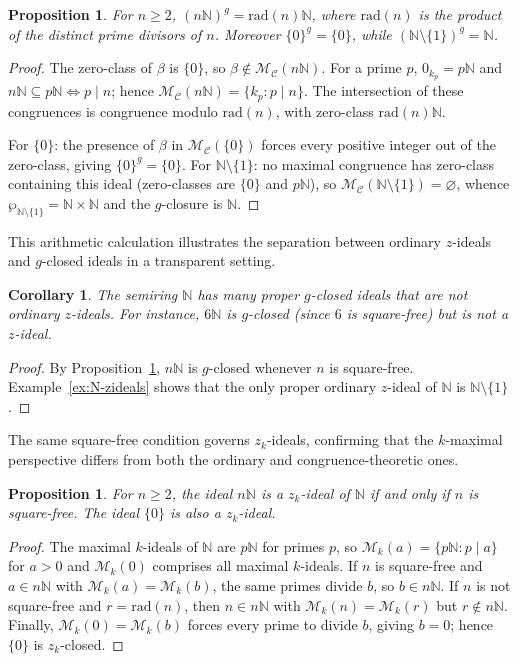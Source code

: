 \documentclass[11pt,leqno]{amsart}
\theoremstyle{plain}
\newtheorem{proposition}[theorem]{Proposition}
\newtheorem{corollary}[theorem]{Corollary}
\theoremstyle{definition}
\theoremstyle{remark}
\numberwithin{equation}{section}
\newcommand{\Mk}{\mathcal M_k}
\newcommand{\MC}{\mathcal M_{\mathcal C}}
\newcommand{\zero}[1]{0_{#1}}
\newcommand{\N}{\mathds N}
\begin{document}
\begin{proposition}\label{prop:N-gclosure-principal}
For $n\geqslant2$, $(n\N)^g=\mathrm{rad}(n)\N$,
where $\mathrm{rad}(n)$ is the product of the distinct prime divisors
of $n$.
Moreover $\{0\}^g=\{0\}$, while $(\N\setminus\{1\})^g=\N$.
\end{proposition}
\begin{proof}
The zero-class of $\beta$ is $\{0\}$, so $\beta\notin\MC(n\N)$.
For a prime $p$, $\zero{k_p}=p\N$ and $n\N\subseteq p\N
\Leftrightarrow p\mid n$; hence $\MC(n\N)=\{k_p:p\mid n\}$.
The intersection of these congruences is congruence modulo
$\mathrm{rad}(n)$, with zero-class $\mathrm{rad}(n)\N$.

For $\{0\}$: the presence of $\beta$ in $\MC(\{0\})$ forces every
positive integer out of the zero-class, giving $\{0\}^g=\{0\}$.
For $\N\setminus\{1\}$: no maximal congruence has zero-class
containing this ideal (zero-classes are $\{0\}$ and $p\N$),
so $\MC(\N\setminus\{1\})=\varnothing$, whence
$\wp_{\N\setminus\{1\}}=\N\times\N$ and the $g$-closure is $\N$.
\end{proof}

This arithmetic calculation illustrates the separation between
ordinary $z$-ideals and $g$-closed ideals in a transparent setting.

\begin{corollary}\label{cor:N-gclosed-many}
The semiring $\N$ has many proper $g$-closed ideals that are not
ordinary $z$-ideals.
For instance, $6\N$ is $g$-closed (since $6$ is square-free)
but is not a $z$-ideal.
\end{corollary}
\begin{proof}
By Proposition~\ref{prop:N-gclosure-principal},
$n\N$ is $g$-closed whenever $n$ is square-free.
Example~\ref{ex:N-zideals} shows that the only proper ordinary
$z$-ideal of $\N$ is $\N\setminus\{1\}$.
\end{proof}

The same square-free condition governs $z_k$-ideals, confirming
that the $k$-maximal perspective differs from both the ordinary
and congruence-theoretic ones.

\begin{proposition}\label{prop:N-zk-principal}
For $n\geqslant2$, the ideal $n\N$ is a $z_k$-ideal of $\N$ if and
only if $n$ is square-free.  The ideal $\{0\}$ is also a $z_k$-ideal.
\end{proposition}
\begin{proof}
The maximal $k$-ideals of $\N$ are $p\N$ for primes $p$, so
$\Mk(a)=\{p\N:p\mid a\}$ for $a>0$ and $\Mk(0)$ comprises
all maximal $k$-ideals.
If $n$ is square-free and $a\in n\N$ with $\Mk(a)=\Mk(b)$,
the same primes divide $b$, so $b\in n\N$.
If $n$ is not square-free and $r=\mathrm{rad}(n)$,
then $n\in n\N$ with $\Mk(n)=\Mk(r)$ but $r\notin n\N$.
Finally, $\Mk(0)=\Mk(b)$ forces every prime to divide $b$,
giving $b=0$; hence $\{0\}$ is $z_k$-closed.
\end{proof}
\end{document}
